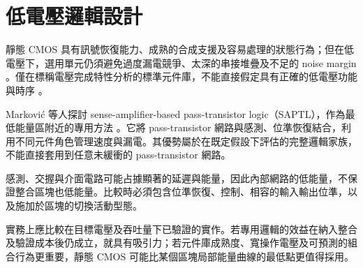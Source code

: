 \section{低電壓邏輯設計}
靜態 CMOS 具有訊號恢復能力、成熟的合成支援及容易處理的狀態行為；但在低電壓下，選用單元仍須避免過度漏電競爭、太深的串接堆疊及不足的 noise margin 。僅在標稱電壓完成特性分析的標準元件庫，不能直接假定具有正確的低電壓功能與時序 \cite{calhoun2005,udvs2010}。

Markovi\'{c} 等人探討 sense-amplifier-based pass-transistor logic（SAPTL），作為最低能量區附近的專用方法 \cite[Sec.~V]{markovic2010}。它將 pass-transistor 網路與感測、位準恢復結合，利用不同元件角色管理速度與漏電。其優勢屬於在既定假設下評估的完整邏輯家族，不能直接套用到任意未緩衝的 pass-transistor 網路。

感測、交握與介面電路可能占據顯著的延遲與能量，因此內部網路的低能量，不保證整合區塊也低能量。比較時必須包含位準恢復、控制、相容的輸入輸出位準，以及施加於區塊的切換活動型態。

實務上應比較在目標電壓及吞吐量下已驗證的實作。若專用邏輯的效益在納入整合及驗證成本後仍成立，就具有吸引力；若元件庫成熟度、寬操作電壓及可預測的組合行為更重要，靜態 CMOS 可能比某個區塊局部能量曲線的最低點更值得採用。

